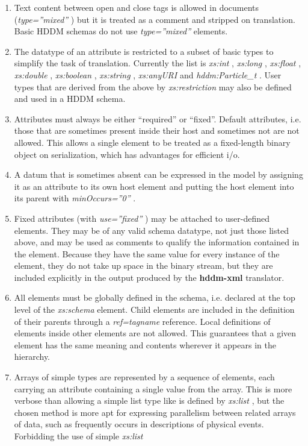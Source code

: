 \documentclass[10pt]{article}
\begin{document}
\begin{enumerate}
\item  Text content between open and close tags is allowed in documents (\emph{type=''mixed''}
) but it is treated as a comment and stripped on translation. Basic HDDM schemas do not use \emph{type=''mixed''}
 elements. 
\item  The datatype of an attribute is restricted to a subset of basic types to simplify the task of translation. Currently the list is \emph{xs:int}
, \emph{xs:long}
, \emph{xs:float}
, \emph{xs:double}
, \emph{xs:boolean}
, \emph{xs:string}
, \emph{xs:anyURI}
 and \emph{hddm:Particle\_t}
. User types that are derived from the above by \emph{xs:restriction}
 may also be defined and used in a HDDM schema. 
\item  Attributes must always be either ``required'' or ``fixed''. Default attributes, i.e. those that are sometimes present inside their host and sometimes not are not allowed. This allows a single element to be treated as a fixed-length binary object on serialization, which has advantages for efficient i/o. 
\item  A datum that is sometimes absent can be expressed in the model by assigning it as an attribute to its own host element and putting the host element into its parent with \emph{minOccurs=''0''}
. 
\item  Fixed attributes (with \emph{use=''fixed''}
) may be attached to user-defined elements. They may be of any valid schema datatype, not just those listed above, and may be used as comments to qualify the information contained in the element. Because they have the same value for every instance of the element, they do not take up space in the binary stream, but they are included explicitly in the output produced by the \textbf{hddm-xml}
 translator. 
\item  All elements must be globally defined in the schema, i.e. declared at the top level of the \emph{xs:schema}
 element. Child elements are included in the definition of their parents through a \emph{ref=tagname}
 reference. Local definitions of elements inside other elements are not allowed. This guarantees that a given element has the same meaning and contents wherever it appears in the hierarchy. 
\item  Arrays of simple types are represented by a sequence of elements, each carrying an attribute containing a single value from the array. This is more verbose than allowing a simple list type like is defined by \emph{xs:list}
, but the chosen method is more apt for expressing parallelism between related arrays of data, such as frequently occurs in descriptions of physical events. Forbidding the use of simple \emph{xs:list}

\end{enumerate}
\end{document}
